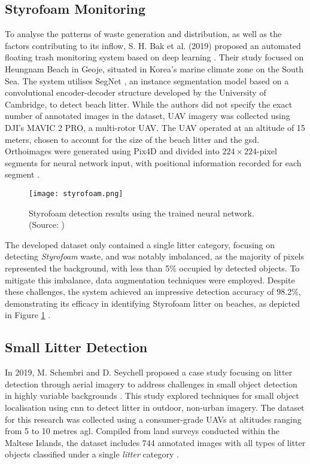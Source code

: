 \subsection{Styrofoam Monitoring}
\label{subsec:3_styrofoam}
To analyse the patterns of waste generation and distribution, as well as the factors contributing to its inflow, S. H. Bak et al. (2019) proposed an automated floating trash monitoring system based on deep learning \cite{styrofoam}. Their study focused on Heungnam Beach in Geoje, situated in Korea’s marine climate zone on the South Sea. The system utilises SegNet \cite{segnet}, an instance segmentation model based on a convolutional encoder-decoder structure developed by the University of Cambridge, to detect beach litter.
While the authors did not specify the exact number of annotated images in the dataset, UAV imagery was collected using DJI's MAVIC 2 PRO, a multi-rotor UAV. The UAV operated at an altitude of 15 meters, chosen to account for the size of the beach litter and the \gls{gsd}. Orthoimages were generated using Pix4D and divided into $224 \times 224$-pixel segments for neural network input, with positional information recorded for each segment \cite{styrofoam}.

\begin{figure}[!htbp]
    \centering
    \texttt{[image: styrofoam.png]}
    \caption{Styrofoam detection results using the trained neural network. (Source: \cite{styrofoam})}
    \label{fig:styrofoam}
\end{figure}

The developed dataset only contained a single litter category, focusing on detecting \textit{Styrofoam} waste, and was notably imbalanced, as the majority of pixels represented the background, with less than 5\% occupied by detected objects. To mitigate this imbalance, data augmentation techniques were employed. Despite these challenges, the system achieved an impressive detection accuracy of 98.2\%, demonstrating its efficacy in identifying Styrofoam litter on beaches, as depicted in Figure \ref{fig:styrofoam} \cite{styrofoam}.

\subsection{Small Litter Detection}
\label{subsec:3_smalldetection}

In 2019, M. Schembri and D. Seychell proposed a case study focusing on litter detection through aerial imagery to address challenges in small object detection in highly variable backgrounds \cite{small_litter_detection}. This study explored techniques for small object localisation using \gls{cnn} to detect litter in outdoor, non-urban imagery. The dataset for this research was collected using a consumer-grade UAVs at altitudes ranging from 5 to 10 metres \gls{agl}. Compiled from land surveys conducted within the Maltese Islands, the dataset includes 744 annotated images with all types of litter objects classified under a single \textit{litter} category \cite{small_litter_detection}.

